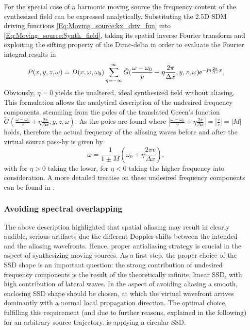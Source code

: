 For the special case of a harmonic moving source the frequency content of the synthesized field can be expressed analytically.
Substituting the 2.5D SDM driving functions \eqref{Eq:Moving_source:kx_driv_fun} into \eqref{Eq:Moving_source:Synth_field}, taking its spatial inverse Fourier transform and exploiting the sifting property of the Dirac-delta in order to evaluate the Fourier integral results in
\begin{equation}
P(x,y,z,\omega) = 
D(x,\omega,\omega_0)
\sum_{\eta = -\infty}^{\infty}
\tilde{G}( \frac{\omega-\omega_0}{v} +  \eta \frac{2\pi}{\Delta x},y,z, \omega )
 \mathrm{e}^{-\mathrm{j}  \eta \frac{2\pi}{\Delta x}  x}.
\end{equation}
Obviously, $\eta = 0$ yields the unaltered, ideal synthesized field without aliasing.
This formulation allows the analytical description of the undesired frequency components, stemming from the poles of the translated Green's function $\tilde{G}( \frac{\omega-\omega_0}{v} +  \eta \frac{2\pi}{\Delta x},y,z, \omega )$.
As the poles are found where $|\frac{\omega-\omega_0}{v} +  \eta \frac{2\pi}{\Delta x}| = |\frac{v}{c}| = |M|$ holds, therefore the actual frequency of the aliasing waves before and after the virtual source pass-by is given by
\begin{equation}
\omega = \frac{1}{1 \pm M} \left( \omega_0 + \eta \frac{2\pi v}{\Delta x} \right),
\end{equation}
with for $\eta > 0$ taking the lower, for $\eta < 0$ taking the higher frequency into consideration.
A more detailed treatise on these undesired frequency components can be found in \cite{firtha2016:daga}.

\subsubsection{Avoiding spectral overlapping}
The above description highlighted that spatial aliasing may result in clearly audible, serious artifacts due the different Doppler-shifts between the intended and the aliasing wavefronts.
Hence, proper antialiasing strategy is crucial in the aspect of synthesizing moving sources.
As a first step, the proper choice of the SSD shape is an important question: the strong contribution of undesired frequency components is the result of the theoretically infinite, linear SSD, with high contribution of lateral waves.
In the aspect of avoiding aliasing a smooth, enclosing SSD shape should be chosen, at which the virtual wavefront arrives dominantly with a normal local propagation direction.
The optimal choice, fulfilling this requirement (and due to further reasons, explained in the following) for an arbitrary source trajectory, is applying a circular SSD.

